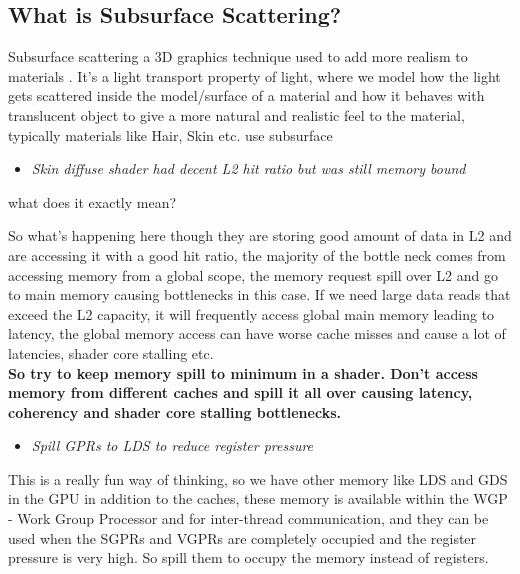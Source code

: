 \documentclass[14pt]{article}
\begin{document}
\subsection*{What is Subsurface Scattering?} 
Subsurface scattering a 3D graphics technique used to add more realism to materials \cite{sss}. It's a light transport property of light, where we model how the light gets scattered inside the model/surface of a material and how it behaves with translucent object to give a more natural and realistic feel to the material, typically materials like Hair, Skin etc. use subsurface 


\begin{itemize}
	\item \textit{Skin diffuse shader had decent L2 hit ratio but was still memory bound}
\end{itemize}

what does it exactly mean?

So what's happening here though they are storing good amount of data in L2 and are accessing it with a good hit ratio, the majority of the bottle neck comes from accessing memory from a global scope, the memory request spill over L2 and go to main memory causing bottlenecks in this case. If we need large data reads that exceed the L2 capacity, it will frequently access global main memory leading to latency, the global memory access can have worse cache misses and cause a lot of latencies, shader core stalling etc. \\

\textbf{So try to keep memory spill to minimum in a shader. Don't access memory from different caches and spill it all over causing latency, coherency and shader core stalling bottlenecks.}


\begin{itemize}
	\item \textit{Spill GPRs to LDS to reduce register pressure}
\end{itemize}

This is a really fun way of thinking, so we have other memory like LDS and GDS in the GPU in addition to the caches, these memory is available within the WGP - Work Group Processor and for inter-thread communication, and they can be used when the SGPRs and VGPRs are completely occupied and the register pressure is very high. So spill them to occupy the memory instead of registers. \\
\end{document}

